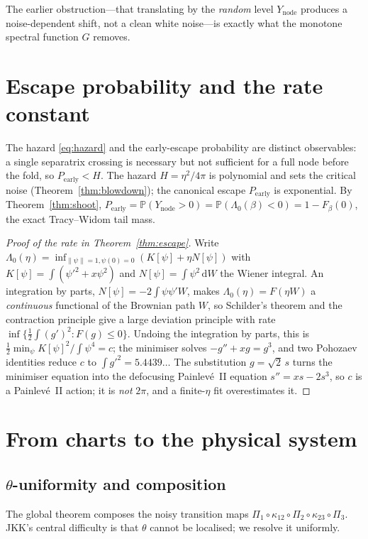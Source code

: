 \documentclass[11pt,reqno]{amsart}
\theoremstyle{plain}
\theoremstyle{definition}
\theoremstyle{remark}
\newcommand{\dd}{\,\mathrm{d}}
\newcommand{\Ynode}{Y_{\mathrm{node}}}
\newcommand{\Pearly}{P_{\mathrm{early}}}
\newcommand{\Lam}{\Lambda_0}
\begin{document}
The earlier obstruction---that translating by the \emph{random} level $\Ynode$ produces a
noise-dependent shift, not a clean white noise---is exactly what the monotone spectral
function $G$ removes.

\section{Escape probability and the rate constant}\label{sec:escape}

The hazard \eqref{eq:hazard} and the early-escape probability are distinct observables: a
single separatrix crossing is necessary but not sufficient for a full node before the fold,
so $\Pearly<H$. The hazard $H=\eta^2/4\pi$ is polynomial and sets the critical noise
(Theorem~\ref{thm:blowdown}); the canonical escape $\Pearly$ is exponential. By
Theorem~\ref{thm:shoot}, $\Pearly=\mathbb P(\Ynode>0)=\mathbb P(\Lam(\beta)<0)=1-F_\beta(0)$,
the exact Tracy--Widom tail mass.

\begin{proof}[Proof of the rate in Theorem~\ref{thm:escape}]
Write $\Lam(\eta)=\inf_{\|\psi\|=1,\psi(0)=0}(K[\psi]+\eta N[\psi])$ with
$K[\psi]=\int(\psi'^2+x\psi^2)$ and $N[\psi]=\int\psi^2\dd W$ the Wiener integral. An
integration by parts, $N[\psi]=-2\int\psi\psi'W$, makes $\Lam(\eta)=F(\eta W)$ a
\emph{continuous} functional of the Brownian path $W$, so Schilder's theorem and the
contraction principle give a large deviation principle with rate
$\inf\{\tfrac12\int(g')^2:F(g)\le0\}$. Undoing the integration by parts, this is
$\tfrac12\min_\psi K[\psi]^2/\!\int\psi^4=c$; the minimiser solves $-g''+xg=g^3$, and two
Pohozaev identities reduce $c$ to $\int g'^2=5.4439\ldots$ The substitution $g=\sqrt2\,s$
turns the minimiser equation into the defocusing Painlev\'e~II equation $s''=xs-2s^3$, so
$c$ is a Painlev\'e~II action; it is \emph{not} $2\pi$, and a finite-$\eta$ fit overestimates
it.
\end{proof}

\section{From charts to the physical system}\label{sec:blowdown}

\subsection{$\theta$-uniformity and composition}
The global theorem composes the noisy transition maps $\Pi_1\circ\kappa_{12}\circ\Pi_2\circ
\kappa_{23}\circ\Pi_3$. JKK's central difficulty is that $\theta$ cannot be localised; we
resolve it uniformly.
\end{document}
